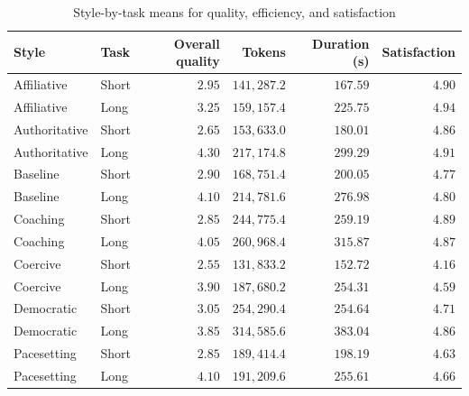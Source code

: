 \begin{table}[htbp]
  \centering
  \small
  \caption{Style-by-task means for quality, efficiency, and satisfaction}
  \label{tab:03-style-by-task-summary}
\begin{tabular}{llrrrr}
    \toprule
    Style & Task & Overall quality & Tokens & Duration (s) & Satisfaction \\
    \midrule
    Affiliative & Short & $2.95$ & $141,287.2$ & $167.59$ & $4.90$ \\
    Affiliative & Long & $3.25$ & $159,157.4$ & $225.75$ & $4.94$ \\
    Authoritative & Short & $2.65$ & $153,633.0$ & $180.01$ & $4.86$ \\
    Authoritative & Long & $4.30$ & $217,174.8$ & $299.29$ & $4.91$ \\
    Baseline & Short & $2.90$ & $168,751.4$ & $200.05$ & $4.77$ \\
    Baseline & Long & $4.10$ & $214,781.6$ & $276.98$ & $4.80$ \\
    Coaching & Short & $2.85$ & $244,775.4$ & $259.19$ & $4.89$ \\
    Coaching & Long & $4.05$ & $260,968.4$ & $315.87$ & $4.87$ \\
    Coercive & Short & $2.55$ & $131,833.2$ & $152.72$ & $4.16$ \\
    Coercive & Long & $3.90$ & $187,680.2$ & $254.31$ & $4.59$ \\
    Democratic & Short & $3.05$ & $254,290.4$ & $254.64$ & $4.71$ \\
    Democratic & Long & $3.85$ & $314,585.6$ & $383.04$ & $4.86$ \\
    Pacesetting & Short & $2.85$ & $189,414.4$ & $198.19$ & $4.63$ \\
    Pacesetting & Long & $4.10$ & $191,209.6$ & $255.61$ & $4.66$ \\
    \bottomrule
\end{tabular}%
\end{table}

